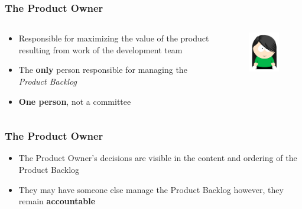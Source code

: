 \begin{frame}
	\frametitle{The Product Owner}
	
	\begin{columns}
		\begin{column}{0.7\textwidth}
			\begin{itemize}
        		\setlength\itemsep{0.7em}
        		\item Responsible for maximizing the value of the product resulting from work of the development team
        		\item The \textbf{only} person responsible for managing the \textit{Product Backlog}
        		\item \textbf{One person}, not a committee
        	\end{itemize}
		\end{column}
		\begin{column}{0.3\textwidth}
		    \vspace{-2em}
			\begin{figure}
                \includegraphics[width=1.6in]{images/po.jpg}
            \end{figure}
		\end{column}
	\end{columns}
\end{frame}

\begin{frame}
	\frametitle{The Product Owner}
	
	\begin{itemize}
		\setlength\itemsep{0.7em}
		\item The Product Owner's decisions are visible in the content and ordering of the Product Backlog
		\item They may have someone else manage the Product Backlog however, they remain \textbf{accountable}
	\end{itemize}
\end{frame}

